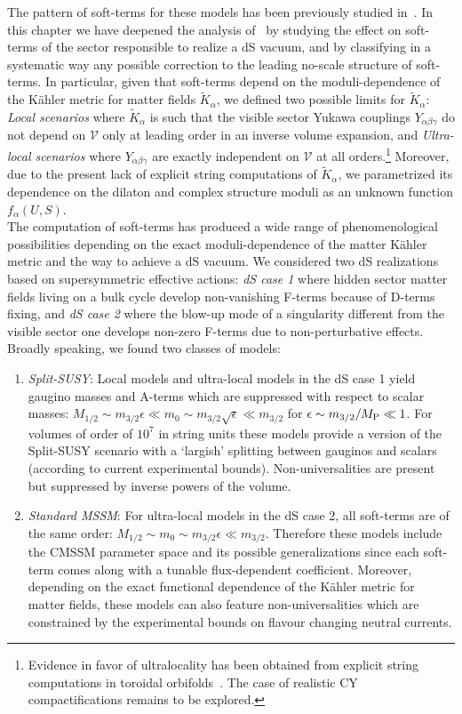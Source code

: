 \documentclass[12pt,a4paper]{book}
\begin{document}
The pattern of soft-terms for these models has been previously studied in~\cite{Blumenhagen:2009gk}. In this chapter we have deepened the analysis of~\cite{Blumenhagen:2009gk} by studying the effect on soft-terms of the sector responsible to realize a dS vacuum, and by classifying in a systematic way any possible correction to the leading no-scale structure of soft-terms. In particular, given that soft-terms depend on the moduli-dependence of the K\"ahler metric for matter fields $\tilde{K}_\alpha$, we defined two possible limits for $\tilde{K}_\alpha$: \emph{Local scenarios} where $\tilde{K}_\alpha$ is such that the visible sector Yukawa couplings $Y_{\alpha\beta\gamma}$ do not depend on $\mathcal{V}$ only at leading order in an inverse volume expansion, and \emph{Ultra-local scenarios} where $Y_{\alpha\beta\gamma}$ are exactly independent on $\mathcal{V}$ at all orders.\footnote{Evidence in favor of ultralocality has been obtained from explicit string computations in toroidal orbifolds~\cite{Conlon:2011jq}. The case of realistic CY compactifications remains to be explored.} Moreover, due to the present lack of explicit string computations of $\tilde{K}_\alpha$, we parametrized its dependence on the dilaton and complex structure moduli as an unknown function $f_\alpha(U,S)$.\\

The computation of soft-terms has produced a wide range of phenomenological possibilities depending on the exact moduli-dependence of the matter K\"ahler metric and the way to achieve a dS vacuum. We considered two dS realizations based on supersymmetric effective actions: \emph{dS case 1} where hidden sector matter fields living on a bulk cycle develop non-vanishing F-terms because of D-terms fixing, and \emph{dS case 2} where the blow-up mode of a singularity different from the visible sector one develops non-zero F-terms due to non-perturbative effects. Broadly speaking, we found two classes of models:
\begin{enumerate}
\item \emph{Split-SUSY}: Local models and ultra-local models in the dS case 1 yield gaugino masses and A-terms which are suppressed with respect to scalar masses: $M_{1/2} \sim m_{3/2}\epsilon\ll m_0 \sim m_{3/2} \sqrt{\epsilon}\ll m_{3/2}$ for $\epsilon \sim m_{3/2}/M_{\rm P}\ll 1$. For volumes of order of $10^7$ in string units these models provide a version of the Split-SUSY scenario with a `largish' splitting between gauginos and scalars (according to current experimental bounds). Non-universalities are present but suppressed by inverse powers of the volume.
\item \emph{Standard MSSM}: For ultra-local models in the dS case 2, all soft-terms are of the same order: $M_{1/2} \sim m_0 \sim m_{3/2}\epsilon\ll m_{3/2}$. Therefore these models include the CMSSM parameter space and its possible generalizations since each soft-term comes along with a tunable flux-dependent coefficient. Moreover, depending on the exact functional dependence of the K\"ahler metric for matter fields, these models can also feature non-universalities which are constrained by the experimental bounds on flavour changing neutral currents.
\end{enumerate}
\end{document}
